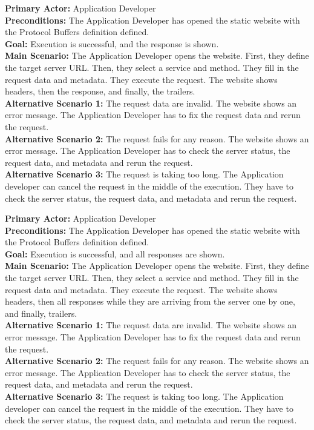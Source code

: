 \textbf{Primary Actor:} Application Developer\\
\textbf{Preconditions:} The Application Developer has opened the static website with the Protocol Buffers definition defined.\\
\textbf{Goal:} Execution is successful, and the response is shown.\\
\textbf{Main Scenario:}
The Application Developer opens the website.
First, they define the target server URL\@.
Then, they select a service and method.
They fill in the request data and metadata.
They execute the request.
The website shows headers, then the response, and finally, the trailers.\\
\textbf{Alternative Scenario 1:}
The request data are invalid.
The website shows an error message.
The Application Developer has to fix the request data and rerun the request.\\
\textbf{Alternative Scenario 2:}
The request fails for any reason.
The website shows an error message.
The Application Developer has to check the server status, the request data, and metadata and rerun the request.\\
\textbf{Alternative Scenario 3:}
The request is taking too long.
The Application developer can cancel the request in the middle of the execution.
They have to check the server status, the request data, and metadata and rerun the request.


\textbf{Primary Actor:} Application Developer\\
\textbf{Preconditions:} The Application Developer has opened the static website with the Protocol Buffers definition defined.\\
\textbf{Goal:} Execution is successful, and all responses are shown.\\
\textbf{Main Scenario:}
The Application Developer opens the website.
First, they define the target server URL\@.
Then, they select a service and method.
They fill in the request data and metadata.
They execute the request.
The website shows headers, then all responses while they are arriving from the server one by one, and finally, trailers.\\
\textbf{Alternative Scenario 1:}
The request data are invalid.
The website shows an error message.
The Application Developer has to fix the request data and rerun the request.\\
\textbf{Alternative Scenario 2:}
The request fails for any reason.
The website shows an error message.
The Application Developer has to check the server status, the request data, and metadata and rerun the request.\\
\textbf{Alternative Scenario 3:}
The request is taking too long.
The Application developer can cancel the request in the middle of the execution.
They have to check the server status, the request data, and metadata and rerun the request.

